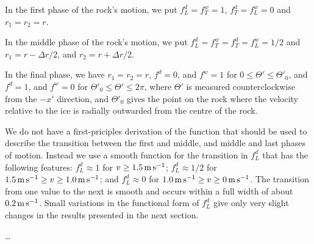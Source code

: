 {\begin{flowtext}{2}
In the first phase of the rock's motion, we put
$f_L^d = f_T^w = 1$,
$f_T^d = f_L^w = 0$ and
$r_1 = r_2 = r$.

In the middle phase of the rock's motion, we put
$f_L^d = f_T^w = f_T^d = f_L^w = 1/2$ and
$r_1 = r - \Delta r/2$, and
$r_2 = r + \Delta r/2$.

In the final phase, we have
$r_1 = r_2 = r$,
$f^d = 0$, and $f^w = 1$ for $0 \le \Theta' \le \Theta'_0$, and
$f^d = 1$, and $f^w = 0$ for $\Theta'_0 \le \Theta' \le 2\pi$, where $\Theta'$
is measured counterclockwise from the $-x'$ direction, and $\Theta'_0$ gives
the point on the rock where the velocity relative to the ice is radially
outwarded from the centre of the rock.

We do not have a first-priciples derivation of the function that should be used
to describe the transition between the first and middle, and middle and last
phases of motion. Instead we use a smooth function for the transition in
$f_L^d$ that has the following features:
$f_L^d \approx 1  $ for $v \ge 1.5 \meter\second^{-1}$;
$f_L^d \approx 1/2$ for $1.5 \meter\second^{-1} \ge v \ge 1.0 \meter\second^{-1}$; and
$f_L^d \approx 0  $ for $1.0 \meter\second^{-1} \ge v \ge 0 \meter\second^{-1}$.
The transition from one value to the next is smooth and occurs within a full
width of about $0.2 \meter\second^{-1}$. Small variations in the functional
form of $f_L^d$ give only very slight changes in the results presented in the
next section.

\end{flowtext}
}

\dots

